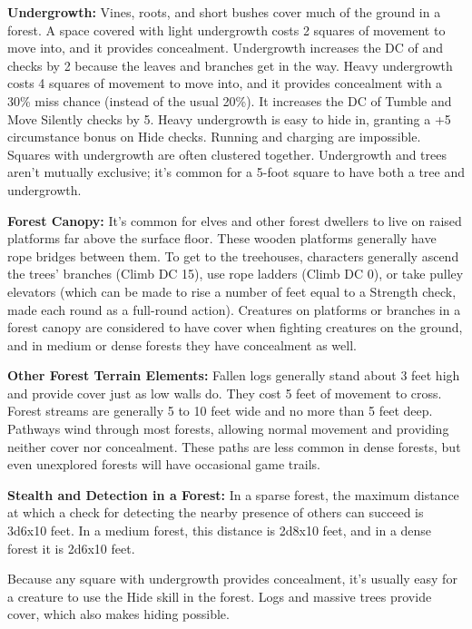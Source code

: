 \textbf{Undergrowth:} Vines, roots, and short bushes cover much of the ground in 
a forest. A space covered with light undergrowth costs 2 squares of movement to 
move into, and it provides concealment. Undergrowth increases the DC of  
and  checks by 2 because the leaves and branches get in the way. Heavy 
undergrowth costs 4 squares of movement to move into, and it provides concealment 
with a 30\% miss chance (instead of the usual 20\%). It increases the DC of Tumble 
and Move Silently checks by 5. Heavy undergrowth is easy to hide in, granting a 
+5 circumstance bonus on Hide checks. Running and charging are impossible. Squares 
with undergrowth are often clustered together. Undergrowth and trees aren't mutually 
exclusive; it's common for a 5-foot square to have both a tree and undergrowth.

\textbf{Forest Canopy:} It's common for elves and other forest dwellers to live 
on raised platforms far above the surface floor. These wooden platforms generally 
have rope bridges between them. To get to the treehouses, characters generally 
ascend the trees' branches (Climb DC 15), use rope ladders (Climb DC 0), or take 
pulley elevators (which can be made to rise a number of feet equal to a Strength 
check, made each round as a full-round action). Creatures on platforms or branches 
in a forest canopy are considered to have cover when fighting creatures on the 
ground, and in medium or dense forests they have concealment as well.

\textbf{Other Forest Terrain Elements:} Fallen logs generally stand about 3 feet 
high and provide cover just as low walls do. They cost 5 feet of movement to cross. 
Forest streams are generally 5 to 10 feet wide and no more than 5 feet deep. Pathways 
wind through most forests, allowing normal movement and providing neither cover 
nor concealment. These paths are less common in dense forests, but even unexplored 
forests will have occasional game trails.

\textbf{Stealth and Detection in a Forest:} In a sparse forest, the maximum distance 
at which a  check for detecting the nearby presence of others can succeed is 
3d6x10 feet. In a medium forest, this distance is 2d8x10 
feet, and in a dense forest it is 2d6x10 feet.

Because any square with undergrowth provides concealment, it's usually easy for 
a creature to use the Hide skill in the forest. Logs and massive trees provide 
cover, which also makes hiding possible.

